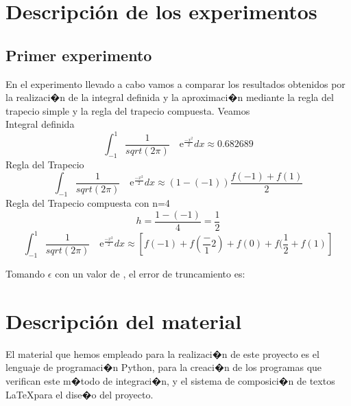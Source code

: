 


\section{Descripci\'on de los experimentos}
\label{3:sec:1}
\parindent=1cm
\raggedright
\subsection{Primer experimento}
En el experimento llevado a cabo vamos a comparar los resultados obtenidos por la realizaci�n de la integral definida y la aproximaci�n
mediante la regla del trapecio simple y la regla del trapecio compuesta. Veamos\\
Integral definida 
\[
\int_{-1}^{1} \frac{1}{sqrt(2\pi)} \quad\text{e}^{\frac{-x^2}{2}}dx\approx0.682689 
\]
Regla del Trapecio
\[
\int_{-1}^{} \frac{1}{sqrt(2\pi)} \quad\text{e}^{\frac{-x^2}{2}}dx\approx\left(1-(-1)\right)\frac{f(-1)+f(1)}{2}
\]
Regla del Trapecio compuesta con n=4
\[
h=\frac{1-(-1)}{4} =\frac{1}{2} 
\]
\[
\int_{-1}^{1} \frac{1}{sqrt(2\pi)} \quad\text{e}^{\frac{-x^2}{2}}dx\approx\left[f(-1) + f(\frac-{1}{2}) + f(0) + f(\frac{1}{2} + f(1)\right]
\]

Tomando $\epsilon$ con un valor de   , el error de truncamiento es:


\section{Descripci\'on del material}
\label{3:sec:2}
\parindent=1cm
\raggedright
El material que hemos empleado para la realizaci�n de este proyecto es el lenguaje de
programaci�n Python, para la creaci�n de los programas que verifican este m�todo de integraci�n, 
y el sistema de composici�n de textos \LaTeX para el dise�o del proyecto.


